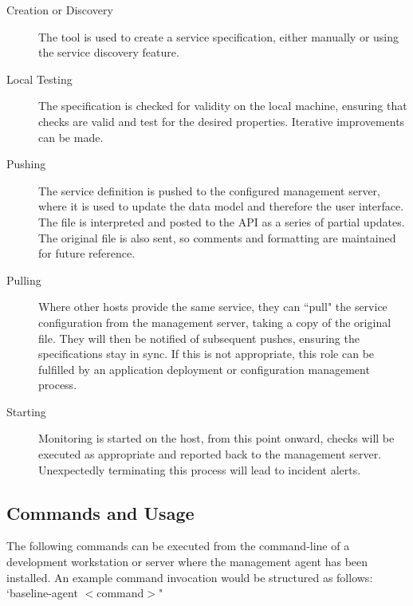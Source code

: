 \documentclass{cshonours}
\begin{document}
\begin{description}
  \item[Creation or Discovery] The tool is used to create a service specification, either manually or using the service discovery feature.
  \item[Local Testing] The specification is checked for validity on the local machine, ensuring that checks are valid and test for the desired properties. Iterative improvements can be made.
  \item[Pushing] The service definition is pushed to the configured management server, where it is used to update the data model and therefore the user interface. The file is interpreted and posted to the API as a series of partial updates. The original file is also sent, so comments and formatting are maintained for future reference.
  \item[Pulling] Where other hosts provide the same service, they can ``pull" the service configuration from the management server, taking a copy of the original file. They will then be notified of subsequent pushes, ensuring the specifications stay in sync. If this is not appropriate, this role can be fulfilled by an application deployment or configuration management process.
  \item[Starting] Monitoring is started on the host, from this point onward, checks will be executed as appropriate and reported back to the management server. Unexpectedly terminating this process will lead to incident alerts.
\end{description}

\subsection{Commands and Usage}

The following commands can be executed from the command-line of a development workstation or server where the management agent has been installed. An example command invocation would be structured as follows: `baseline-agent $<$command$>$"
\end{document}
